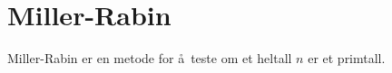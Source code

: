 \section{Miller-Rabin}

Miller-Rabin er en metode for å teste om et heltall $n$
er et primtall.
\cite{miller_riemanns_1975}
\cite{rabin_probabilistic_1980}

